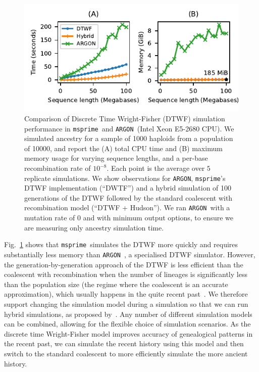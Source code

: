 \documentclass{article}
\newcommand{\msprime}[0]{\texttt{msprime}}
\newcommand{\ARGON}[0]{\texttt{ARGON}}
\begin{document}
\begin{figure}
\begin{center}
\includegraphics[width=\textwidth]{figures/dtwf-perf}
\end{center}
\caption{\label{fig-dtwf-perf} Comparison of Discrete Time Wright-Fisher
(DTWF) simulation performance in \msprime\ and \ARGON\ (Intel Xeon E5-2680 CPU).
We simulated ancestry for a sample of 1000 haploids from a population of 10000,
and report the (A) total CPU time and (B) maximum memory usage for varying
sequence lengths, and a per-base recombination rate of $10^{-8}$. Each
point is the average over $5$ replicate simulations.
We show observations for \ARGON, \msprime's DTWF implementation (``DWTF'')
and a hybrid simulation of 100 generations of the DTWF followed by
the standard coalescent with recombination model (``DTWF + Hudson'').
We ran \ARGON\ with a mutation rate of $0$ and with minimum output options,
to ensure we are measuring only ancestry simulation time.}
\end{figure}

Fig.~\ref{fig-dtwf-perf} shows that \msprime\ simulates the DTWF
more quickly and requires substantially less memory than
\ARGON~\citep{palamara2016argon}, a specialised DTWF simulator.
However, the generation-by-generation approach of the DTWF is less
efficient than the coalescent with recombination when the
number of lineages is significantly less than the population size
(the regime where the coalescent is an accurate approximation),
which usually happens in the quite recent
past~\cite{bhaskar2014distortion}.
We therefore support changing the simulation model during a simulation
so that we can run hybrid simulations, as proposed by~\cite{bhaskar2014distortion}.
Any number of different simulation models can be combined, allowing for the
flexible choice of simulation scenarios.
As the discrete time Wright-Fisher model improves accuracy of genealogical
patterns in the recent past, we can simulate the recent history using this
model and then switch to the standard coalescent to more efficiently simulate
the more ancient history.
\end{document}

